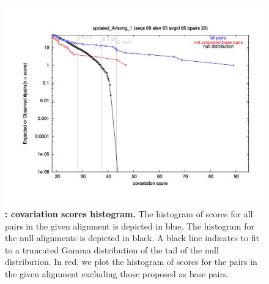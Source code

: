  \begin{figure}
   \includegraphics[scale=0.50]{Arisong_his.pdf} 
 \caption{\small\textbf{:
     covariation scores histogram.}  The histogram of scores for all
   pairs in the given alignment is depicted in blue. The histogram for
   the null alignments is depicted in black. A black line indicates to
   fit to a truncated Gamma distribution of the tail of the null
   distribution. In red, we plot the histogram of scores for the pairs
   in the given alignment excluding those proposed as base pairs.}
 \label{fig:histogram}
 \end{figure}


